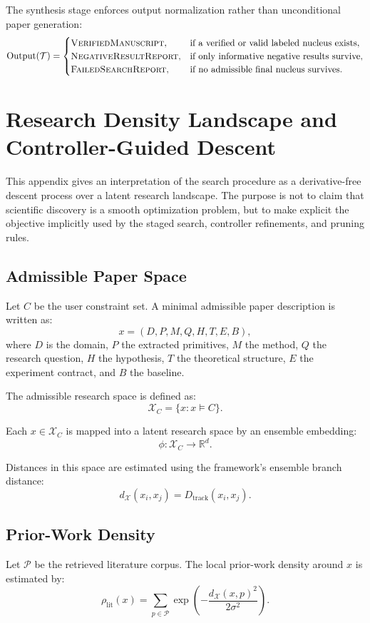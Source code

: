 \documentclass[11pt]{article}
\newcommand{\Tree}{\mathcal{T}}
\begin{document}
The synthesis stage enforces output normalization rather than unconditional paper generation:
$$
\operatorname{Output}(\Tree)
=
\begin{cases}
\textsc{VerifiedManuscript}, & \text{if a verified or valid labeled nucleus exists},\\
\textsc{NegativeResultReport}, & \text{if only informative negative results survive},\\
\textsc{FailedSearchReport}, & \text{if no admissible final nucleus survives}.
\end{cases}
$$

\appendix
\section{Research Density Landscape and Controller-Guided Descent}
This appendix gives an interpretation of the search procedure as a derivative-free descent process over a latent research landscape. The purpose is not to claim that scientific discovery is a smooth optimization problem, but to make explicit the objective implicitly used by the staged search, controller refinements, and pruning rules.

\subsection{Admissible Paper Space}
Let $C$ be the user constraint set. A minimal admissible paper description is written as:
$$ x = (D,P,M,Q,H,T,E,B), $$
where $D$ is the domain, $P$ the extracted primitives, $M$ the method, $Q$ the research question, $H$ the hypothesis, $T$ the theoretical structure, $E$ the experiment contract, and $B$ the baseline.

The admissible research space is defined as:
$$ \mathcal{X}_C = \{x : x \models C\}. $$

Each $x\in\mathcal{X}_C$ is mapped into a latent research space by an ensemble embedding:
$$ \phi:\mathcal{X}_C\rightarrow \mathbb{R}^d. $$

Distances in this space are estimated using the framework's ensemble branch distance:
$$ d_{\mathcal{X}}(x_i,x_j)=D_{\mathrm{track}}(x_i,x_j). $$

\subsection{Prior-Work Density}
Let $\mathcal{P}$ be the retrieved literature corpus. The local prior-work density around $x$ is estimated by:
$$ \rho_{\mathrm{lit}}(x) = \sum_{p\in\mathcal{P}} \exp\left( -\frac{d_{\mathcal{X}}(x,p)^2}{2\sigma^2} \right). $$
\end{document}
